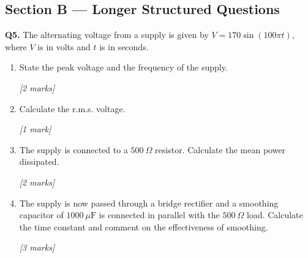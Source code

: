 \subsection*{Section B — Longer Structured Questions}

\begin{tcolorbox}[colback=white, colframe=midblue, breakable]

\begin{minipage}{\linewidth}
\textbf{Q5.} The alternating voltage from a supply is given by $V = 170\sin(100\pi t)$, where $V$ is in volts and $t$ is in seconds.
\end{minipage}

\begin{enumerate}[label=(\alph*)]
  \item \begin{minipage}[t]{\linewidth}
  State the peak voltage and the frequency of the supply.
  \par\hfill\textit{[2 marks]}
  \vspace{2.5cm}
  \end{minipage}

  \item \begin{minipage}[t]{\linewidth}
  Calculate the r.m.s. voltage.
  \par\hfill\textit{[1 mark]}
  \vspace{2cm}
  \end{minipage}

  \item \begin{minipage}[t]{\linewidth}
  The supply is connected to a $500\ \Omega$ resistor. Calculate the mean power dissipated.
  \par\hfill\textit{[2 marks]}
  \vspace{3cm}
  \end{minipage}

  \item \begin{minipage}[t]{\linewidth}
  The supply is now passed through a bridge rectifier and a smoothing capacitor of $1000\ \mu\text{F}$ is connected in parallel with the $500\ \Omega$ load. Calculate the time constant and comment on the effectiveness of smoothing.
  \par\hfill\textit{[3 marks]}
  \vspace{4cm}
  \end{minipage}
\end{enumerate}


\end{tcolorbox}
